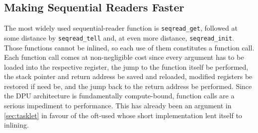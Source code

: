 \subsection{Making Sequential Readers Faster}
\label{sec:mram:merge:faster}



The most widely used sequential-reader function is \lstinline|seqread_get|, followed at some distance by \lstinline|seqread_tell| and, at even more distance, \lstinline|seqread_init|.
Those functions cannot be inlined, so each use of them constitutes a function call.
Each function call comes at non-negligible cost since every argument has to be loaded into the respective register, the jump to the function itself be performed, the stack pointer and return address be saved and reloaded, modified registers be restored if need be, and the jump back to the return address be performed.
Since the \ac{DPU} architecture is fundamentally compute-bound, function calls are a serious impediment to performance.
This has already been an argument in \cref{sec:tasklet} in favour of the oft-used \IS{} whose short implementation lent itself to inlining.

